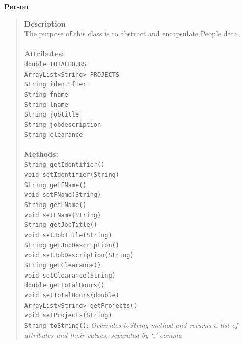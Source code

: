\documentclass[12pt]{article}
\begin{document}
{\bf Person}
\begin{quote}
{\bf Description}\\
The purpose of this class is to abstract and encapsulate People data.\\\\
{\bf Attributes:}\\
\texttt{double TOTALHOURS}\\
\texttt{ArrayList<String> PROJECTS}\\
\texttt{String identifier}\\
\texttt{String fname}\\
\texttt{String lname}\\
\texttt{String jobtitle}\\
\texttt{String jobdescription}\\
\texttt{String clearance}\\\\
{\bf Methods:}\\
\texttt{String getIdentifier() }\\
\texttt{void setIdentifier(String) }\\
\texttt{String getFName() }\\
\texttt{void setFName(String) }\\
\texttt{String getLName() }\\
\texttt{void setLName(String) }\\
\texttt{String getJobTitle() }\\
\texttt{void setJobTitle(String) }\\
\texttt{String getJobDescription() }\\
\texttt{void setJobDescription(String) }\\
\texttt{String  getClearance() }\\
\texttt{void setClearance(String) }\\
\texttt{double getTotalHours() }\\
\texttt{void setTotalHours(double)  }\\
\texttt{ArrayList<String> getProjects()  }\\
\texttt{void setProjects(String) }\\
\texttt{String toString()}: \emph{Overrides toString method and returns a list of attributes and their values, separated by `,' comma}
\end{quote}
 
\end{document}
